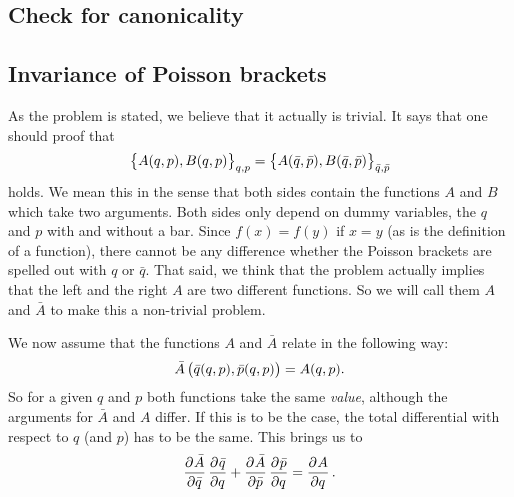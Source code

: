 \documentclass[11pt, ngerman, fleqn, DIV=15, headinclude, BCOR=1cm]{scrartcl}
\begin{document}
\subsection{Check for canonicality}

\subsection{Invariance of Poisson brackets}
\label{sec:invar_poisson}

As the problem is stated, we believe that it actually is trivial. It says that
one should proof that
\[
    \cbr{A(q, p), B(q, p)}_{q,p} = \cbr{A(\bar q, \bar p), B(\bar q, \bar
    p)}_{\bar q,\bar p}
\]
holds. We mean this in the sense that both sides contain the functions $A$ and
$B$ which take two arguments. Both sides only depend on dummy variables, the
$q$ and $p$ with and without a bar. Since $f(x) = f(y)$ if $x = y$ (as is the
definition of a function), there cannot be any difference whether the Poisson
brackets are spelled out with $q$ or $\bar q$. That said, we think that the
problem actually implies that the left and the right $A$ are two different
functions. So we will call them $A$ and $\bar A$ to make this a non-trivial
problem.

We now assume that the functions $A$ and $\bar A$ relate in the following way:
\[
    \bar A\del{\bar q(q, p), \bar p(q, p)} = A(q, p).
\]
So for a given $q$ and $p$ both functions take the same \emph{value}, although
the arguments for $\bar A$ and $A$ differ. If this is to be the case, the total
differential with respect to $q$ (and $p$) has to be the same. This brings us
to
\[
    \dpd{\bar A}{\bar q} \dpd{\bar q}q + \dpd{\bar A}{\bar p} \dpd{\bar p}q =
    \dpd Aq.
\]
\end{document}
